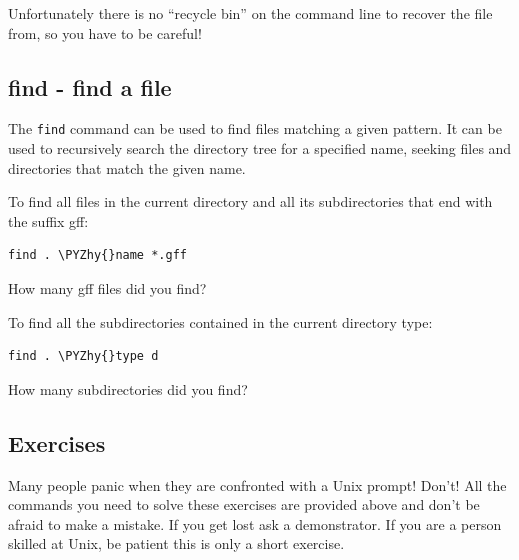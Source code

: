 \documentclass[11pt]{article}
\makeatletter
\def\PYZhy{\char`\-}
\newcommand{\boxspacing}{\kern\kvtcb@left@rule\kern\kvtcb@boxsep}
\newcommand{\prompt}[4]{
       \ttfamily\llap{{\color{#2}\LARGE\faKeyboardO\hspace{3pt}#4}}\vspace{-\baselineskip}
    }
\makeatother
\begin{document}
    Unfortunately there is no ``recycle bin'' on the command line to recover
the file from, so you have to be careful!

    \hypertarget{find---find-a-file}{%
\subsection{find - find a file}\label{find---find-a-file}}

The \texttt{find} command can be used to find files matching a given
pattern. It can be used to recursively search the directory tree for a
specified name, seeking files and directories that match the given name.

    To find all files in the current directory and all its subdirectories
that end with the suffix gff:

    \begin{tcolorbox}[breakable, size=fbox, boxrule=1pt, pad at break*=1mm,colback=cellbackground, colframe=cellborder]
\prompt{In}{incolor}{ }{\boxspacing}
\begin{Verbatim}[commandchars=\\\{\}]
find . \PYZhy{}name *.gff
\end{Verbatim}
\end{tcolorbox}

    How many gff files did you find?

    To find all the subdirectories contained in the current directory type:

    \begin{tcolorbox}[breakable, size=fbox, boxrule=1pt, pad at break*=1mm,colback=cellbackground, colframe=cellborder]
\prompt{In}{incolor}{ }{\boxspacing}
\begin{Verbatim}[commandchars=\\\{\}]
find . \PYZhy{}type d
\end{Verbatim}
\end{tcolorbox}

    How many subdirectories did you find?

    \hypertarget{exercises}{%
\subsection{Exercises}\label{exercises}}

Many people panic when they are confronted with a Unix prompt! Don't!
All the commands you need to solve these exercises are provided above
and don't be afraid to make a mistake. If you get lost ask a
demonstrator. If you are a person skilled at Unix, be patient this is
only a short exercise.
\end{document}
